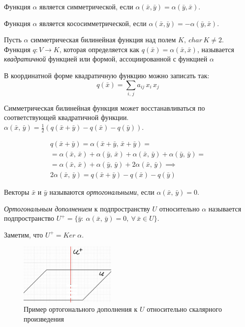 Функция $\alpha$ является симметрической, если $\alpha(\bar{x}, \bar{y}) = \alpha(\bar{y}, \bar{x})$.

Функция $\alpha$ является кососимметрической, если $\alpha(\bar{x}, \bar{y}) = -\alpha(\bar{y}, \bar{x})$.

\begin{definition}
  Пусть $\alpha$ симметрическая билинейная функция над полем $K,~ char\, K \neq 2$. Функция $q: V \to K$, которая определяется как $q(\bar{x}) = \alpha(\bar{x}, \bar{x})$, называется \textit{квадратичной} функцией или формой, ассоциированной с функцией $\alpha$
\end{definition}

В координатной форме квадратичную функцию можно записать так:
$$
  q(\bar{x}) = \sum_{i,\, j} a_{ij}\,x_i\, x_j
$$

Симметрическая билинейная функция может восстанавливаться по соответствующей квадратичной функции.
$\alpha(\bar{x},\, \bar{y}) = \frac{1}{2} (q(\bar{x} + \bar{y}) - q(\bar{x}) - q(\bar{y}))$.
\begin{Proof}
  \begin{gather*}
    q(\bar{x} + \bar{y}) = \alpha(\bar{x} + \bar{y},\, \bar{x} + \bar{y}) = \\
    = \alpha(\bar{x}, \, \bar{x}) + \alpha(\bar{y},\, \bar{x}) + \alpha(\bar{x}, \, \bar{y}) + \alpha(\bar{y}, \, \bar{y}) = \\
    = \alpha(\bar{x}, \, \bar{x}) + \alpha(\bar{y}, \, \bar{y}) + 2\alpha(\bar{x}, \, \bar{y}) \implies \\
    2\alpha(\bar{x}, \, \bar{y}) = q(\bar{x} + \bar{y}) - q(\bar{x}) - q(\bar{y})
  \end{gather*}
\end{Proof}

\begin{definition}
  Векторы $\bar{x}$ и $\bar{y}$ называются \textit{ортогональными}, если $\alpha(\bar{x}, \, \bar{y}) = 0$.
\end{definition}

\begin{definition}
  \textit{Ортогональным дополнением} к подпространству $U$ относительно $\alpha$ называется подпространство $U^+ = \{\bar{y}:~ \alpha(\bar{x}, \, \bar{y}) = 0, ~ \forall \, \bar{x} \in U\}$.

  Заметим, что $U^{+} = Ker\; \alpha$.
\end{definition}  

\begin{figure}[H]
  \centering
  \includegraphics[height = 3cm]{images/map_form_ortog.png}
  \caption{Пример ортогонального дополнения к $U$ относительно скалярного произведения}
\end{figure}


